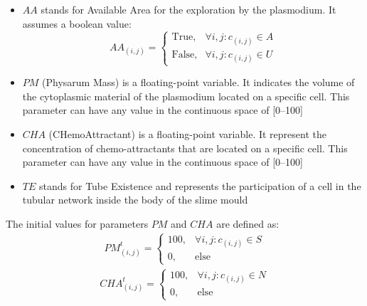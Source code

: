 \begin{itemize}
	\item $AA$ stands for Available Area for the exploration by the plasmodium. It assumes a boolean value:  	
\[AA_{(i, j)}=\begin{cases} \mbox{True}, & \forall i, j: c_{(i,j)} \in A \\ \mbox{False}, &  \forall i, j: c_{(i,j)} \in U\end{cases}\]
	\item $PM$ (Physarum Mass) is a floating-point variable. It indicates the volume of the cytoplasmic material of the plasmodium located on a specific cell. This parameter can have any value in the continuous space of [0–100]
	\item $CHA$ (CHemoAttractant) is a floating-point variable. It represent the concentration of chemo-attractants that are located on a specific cell. This parameter can have any value in the continuous space of [0–100]
	\item $TE$ stands for Tube Existence and represents the participation of a cell in the tubular network inside the body of the slime mould
\end{itemize}

The initial values for parameters $PM$ and $CHA$ are defined as:
\begin{align}
PM^t_{(i, j)}=\begin{cases} 100, & \forall i, j: c_{(i,j)} \in S \\ 0, & \mbox{else}\end{cases}
\end{align}
\begin{align}
CHA^t_{(i, j)}=\begin{cases} 100, & \forall i, j: c_{(i,j)} \in N \\ 0, & \mbox{else}\end{cases}
\end{align}

